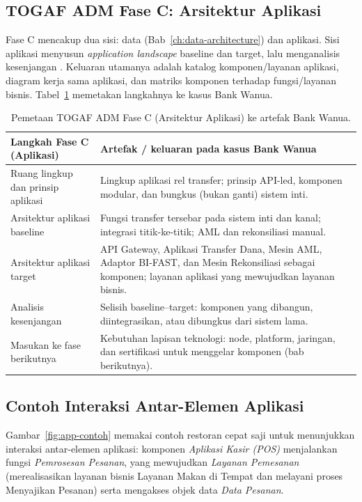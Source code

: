 \subsection{TOGAF ADM Fase C: Arsitektur Aplikasi}

Fase C mencakup dua sisi: data (Bab~\ref{ch:data-architecture}) dan aplikasi.
Sisi aplikasi menyusun \emph{application landscape} baseline dan target, lalu
menganalisis kesenjangan \cite{togaf10}. Keluaran utamanya adalah katalog
komponen/layanan aplikasi, diagram kerja sama aplikasi, dan matriks komponen
terhadap fungsi/layanan bisnis. Tabel~\ref{tab:adm-phase-c-app} memetakan
langkahnya ke kasus Bank Wanua.

\begin{table}[htbp]
\centering
\scriptsize
\caption{Pemetaan TOGAF ADM Fase C (Arsitektur Aplikasi) ke artefak Bank Wanua.}
\label{tab:adm-phase-c-app}
\begin{tabularx}{\textwidth}{@{}p{} X@{}}
\hline
\textbf{Langkah Fase C (Aplikasi)} & \textbf{Artefak / keluaran pada kasus Bank Wanua} \\
\hline
Ruang lingkup dan prinsip aplikasi & Lingkup aplikasi rel transfer; prinsip
API-led, komponen modular, dan bungkus (bukan ganti) sistem inti. \\
Arsitektur aplikasi baseline & Fungsi transfer tersebar pada sistem inti dan
kanal; integrasi titik-ke-titik; AML dan rekonsiliasi manual. \\
Arsitektur aplikasi target & API Gateway, Aplikasi Transfer Dana, Mesin AML,
Adaptor BI-FAST, dan Mesin Rekonsiliasi sebagai komponen; layanan aplikasi yang
mewujudkan layanan bisnis. \\
Analisis kesenjangan & Selisih baseline--target: komponen yang dibangun,
diintegrasikan, atau dibungkus dari sistem lama. \\
Masukan ke fase berikutnya & Kebutuhan lapisan teknologi: node, platform,
jaringan, dan sertifikasi untuk menggelar komponen (bab berikutnya). \\
\hline
\end{tabularx}
\end{table}

\subsection{Contoh Interaksi Antar-Elemen Aplikasi}

Gambar~\ref{fig:app-contoh} memakai contoh restoran cepat saji untuk menunjukkan
interaksi antar-elemen aplikasi: komponen \emph{Aplikasi Kasir (POS)}
menjalankan fungsi \emph{Pemrosesan Pesanan}, yang mewujudkan \emph{Layanan
Pemesanan} (merealisasikan layanan bisnis Layanan Makan di Tempat dan melayani
proses Menyajikan Pesanan) serta mengakses objek data \emph{Data Pesanan}.

